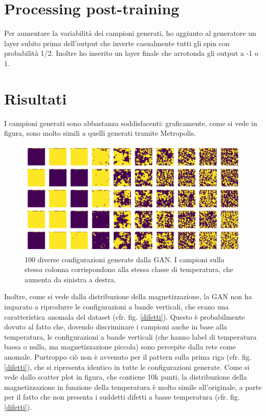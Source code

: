 \documentclass[Lau, noexaminfo, oneside]{sapthesis} %
\begin{document}
\section{Processing post-training}
Per aumentare la variabilità dei campioni generati, ho aggiunto al generatore un layer subito prima dell'output che inverte casualmente tutti gli spin con probabilità 1/2. Inoltre ho inserito un layer finale che arrotonda gli output a -1 o 1.
\section{Risultati}
I campioni generati sono abbastanza soddisfacenti: graficamente, come si vede in figura, sono molto simili a quelli generati tramite Metropolis. 
\begin{figure}[H]
\includegraphics[width=\textwidth]{fig1.png}
\centering
\caption{100 diverse configurazioni generate dalla GAN. I campioni sulla stessa colonna corrispondono alla stessa classe di temperatura, che aumenta da sinistra a destra.}
\end{figure}
Inoltre, come si vede dalla distribuzione della magnetizzazione, la GAN non ha imparato a riprodurre le configurazioni a bande verticali, che erano una caratteristica anomala del dataset (cfr. fig. \ref{difetti}). Questo è probabilmente dovuto al fatto che, dovendo discriminare i campioni anche in base alla temperatura, le configurazioni a bande verticali (che hanno label di temperatura bassa o nulla, ma magnetizzazione piccola) sono percepite dalla rete come anomale. Purtroppo ciò non è avvenuto per il pattern sulla prima riga (cfr. fig. \ref{difetti}), che si ripresenta identico in tutte le configurazioni generate.
Come si vede dallo scatter plot in figura, che contiene 10k punti, la distribuzione della magnetizzazione in funzione della temperatura è molto simile all'originale, a parte per il fatto che non presenta i suddetti difetti a basse temperatura (cfr. fig. \ref{difetti}).
\end{document}
